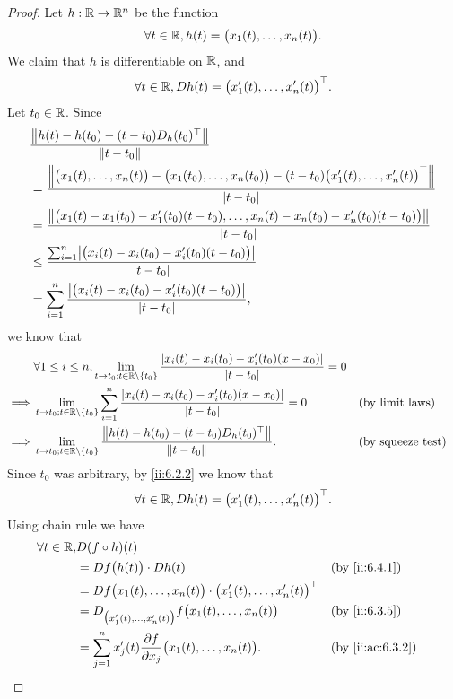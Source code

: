 \begin{proof}
  Let \(h : \R \to \R^n\) be the function
  \[
    \forall t \in \R, h(t) = \big(x_1(t), \dots, x_n(t)\big).
  \]
  We claim that \(h\) is differentiable on \(\R\), and
  \[
    \forall t \in \R, D h(t) = \big(x_1'(t), \dots, x_n'(t)\big)^\top.
  \]
  Let \(t_0 \in \R\).
  Since
  \begin{align*}
     & \dfrac{\norm*{h(t) - h(t_0) - (t - t_0) D_h(t_0)^\top}}{\norm*{t - t_0}}                                                                                  \\
     & = \dfrac{\norm*{\big(x_1(t), \dots, x_n(t)\big) - \big(x_1(t_0), \dots, x_n(t_0)\big) - (t - t_0) \big(x_1'(t), \dots, x_n'(t)\big)^\top}}{\abs{t - t_0}} \\
     & = \dfrac{\norm*{\big(x_1(t) - x_1(t_0) - x_1'(t_0)(t - t_0), \dots, x_n(t) - x_n(t_0) - x_n'(t_0)(t - t_0)\big)}}{\abs{t - t_0}}                          \\
     & \leq \dfrac{\sum_{i = 1}^n \abs{\big(x_i(t) - x_i(t_0) - x_i'(t_0)(t - t_0)\big)}}{\abs{t - t_0}}                                                         \\
     & = \sum_{i = 1}^n \dfrac{\abs{\big(x_i(t) - x_i(t_0) - x_i'(t_0)(t - t_0)\big)}}{\abs{t - t_0}},
  \end{align*}
  we know that
  \begin{align*}
             & \forall 1 \leq i \leq n, \lim_{t \to t_0 ; t \in \R \setminus \set{t_0}} \dfrac{\abs{x_i(t) - x_i(t_0) - x_i'(t_0)(x - x_0)}}{\abs{t - t_0}} = 0                               \\
    \implies & \lim_{t \to t_0 ; t \in \R \setminus \set{t_0}} \sum_{i = 1}^n \dfrac{\abs{x_i(t) - x_i(t_0) - x_i'(t_0)(x - x_0)}}{\abs{t - t_0}} = 0           &  & \text{(by limit laws)}   \\
    \implies & \lim_{t \to t_0 ; t \in \R \setminus \set{t_0}} \dfrac{\norm*{h(t) - h(t_0) - (t - t_0) D_h(t_0)^\top}}{\norm*{t - t_0}}.                        &  & \text{(by squeeze test)}
  \end{align*}
  Since \(t_0\) was arbitrary, by \cref{ii:6.2.2} we know that
  \[
    \forall t \in \R, D h(t) = \big(x_1'(t), \dots, x_n'(t)\big)^\top.
  \]
  Using chain rule we have
  \begin{align*}
    \forall t \in \R, & D (f \circ h)(t)                                                                                                \\
                      & = D f\big(h(t)\big) \cdot D h(t)                                                          &  & \by{ii:6.4.1}    \\
                      & = D f\big(x_1(t), \dots, x_n(t)\big) \cdot \big(x_1'(t), \dots, x_n'(t)\big)^\top                               \\
                      & = D_{\big(x_1'(t), \dots, x_n'(t)\big)} f\big(x_1(t), \dots, x_n(t)\big)                  &  & \by{ii:6.3.5}    \\
                      & = \sum_{j = 1}^n x_j'(t) \dfrac{\partial f}{\partial x_j}\big(x_1(t), \dots, x_n(t)\big). &  & \by{ii:ac:6.3.2}
  \end{align*}
\end{proof}

